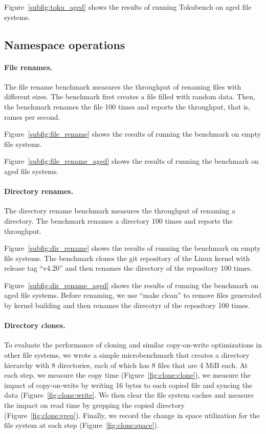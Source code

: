 Figure~\ref{subfig:toku_aged} shows the results of running Tokubench on aged
file systems.

\subsection{Namespace operations}

\paragraph{File renames.}
The file rename benchmark measures the throughput of renaming files with
different sizes.
The benchmark first creates a file filled with random data.
Then, the benchmark renames the file 100 times and reports the throughput,
that is, rames per second.

Figure~\ref{subfig:file_rename} shows the results of running the benchmark on
empty file systems.

Figure~\ref{subfig:file_rename_aged} shows the results of running the benchmark
on aged file systems.

\paragraph{Directory renames.}
The directory rename benchmark measures the throughput of renaming a directory.
The benchmark renames a directory 100 times and reports the throughput.

Figure~\ref{subfig:dir_rename} shows the results of running the benchmark on
empty file systems.
The benchmark clones the git repository of the Linux kernel with release tag
``v4.20'' and then renames the directory of the repository 100 times.

Figure~\ref{subfig:dir_rename_aged} shows the results of running the benchmark on
aged file systems.
Before renaming, we use ``make clean'' to remove files generated by kernel
building and then renames the direcotyr of the repository 100 times.

\paragraph{Directory clones.}
To evaluate the performance of cloning and similar copy-on-write optimizations
in other file systems,
we wrote a simple microbenchmark that creates a directory hierarchy with 8
directories, each of which has 8 files that are 4 MiB each.
At each step, we measure the copy time (Figure~\ref{fig:clone:clone}),
we measure the impact of copy-on-write by writing 16 bytes to each copied file
and syncing the data (Figure~\ref{fig:clone:write}.
We then clear the file system caches and measure the impact on read time by
grepping the copied directory (Figure~\ref{fig:clone:grep}).
Finally, we record the change in space utilization for the file system at each
step (Figure~\ref{fig:clone:space}).

